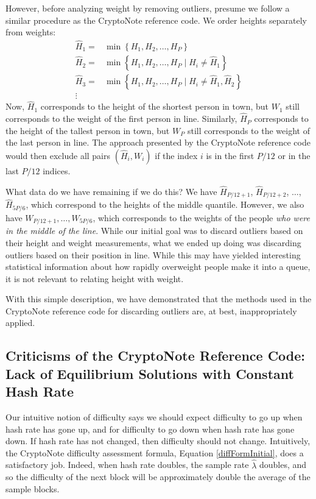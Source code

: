 \documentclass[12pt,english]{mrl}
\theoremstyle{definition}
\numberwithin{equation}{section}
\numberwithin{figure}{section}
\numberwithin{equation}{section}
\numberwithin{equation}{section}
\numberwithin{figure}{section}
\begin{document}
However, before analyzing weight by removing outliers, presume we follow a similar procedure as the CryptoNote reference code. We order heights separately from weights:
\begin{align*}
\hat{H}_1 =& \min\left\{H_1, H_2, \ldots, H_P\right\}\\
\hat{H}_2 =& \min\left\{H_1, H_2, \ldots, H_P \mid H_i \neq \hat{H}_1\right\}\\
\hat{H}_3 =& \min\left\{H_1, H_2, \ldots, H_P \mid H_i \neq \hat{H}_1, \hat{H}_2\right\}\\
\vdots
\end{align*}
Now, $\hat{H}_1$ corresponds to the height of the shortest person in town, but $W_1$ still corresponds to the weight of the first person in line. Similarly, $\hat{H}_P$ corresponds to the height of the tallest person in town, but $W_P$ still corresponds to the weight of the last person in line.  The approach presented by the CryptoNote reference code would then exclude all pairs $(\hat{H}_i, W_i)$ if the index $i$ is in the first $P/12$ or in the last $P/12$ indices.

What data do we have remaining if we do this? We have $\hat{H}_{P/12 + 1}$, $\hat{H}_{P/12 + 2}$, $\ldots$, $\hat{H}_{5P/6}$, which correspond to the heights of the middle quantile. However, we also have $W_{P/12 + 1}, \ldots, W_{5P/6}$, which corresponds to the weights of the people \emph{who were in the middle of the line}. While our initial goal was to discard outliers based on their height and weight measurements, what we ended up doing was discarding outliers based on their position in line. While this may have yielded interesting statistical information about how rapidly overweight people make it into a queue, it is not relevant to relating height with weight. 

With this simple description, we have demonstrated that the methods used in the CryptoNote reference code for discarding outliers are, at best, inappropriately applied.

\subsection{Criticisms of the CryptoNote Reference Code: Lack of Equilibrium Solutions with Constant Hash Rate}\label{clockproblems}

Our intuitive notion of difficulty says we should expect difficulty to go up when hash rate has gone up, and for difficulty to go down when hash rate has gone down. If hash rate has not changed, then difficulty should not change. Intuitively, the CryptoNote difficulty assessment formula, Equation \ref{diffFormInitial}, does a satisfactory job. Indeed, when hash rate doubles, the sample rate $\hat{\lambda}$ doubles, and so the difficulty of the next block will be approximately double the average of the sample blocks.  
\end{document}

